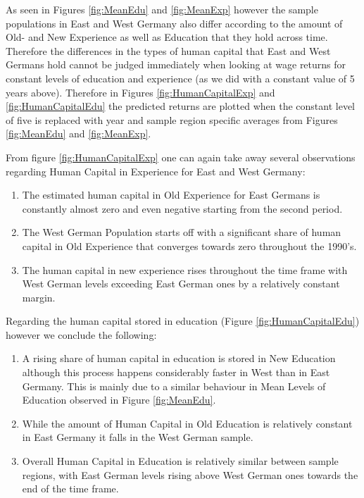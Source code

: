 \documentclass{article}
\begin{document}
As seen in Figures \ref{fig:MeanEdu} and \ref{fig:MeanExp} however the sample populations in East and West Germany also differ according to the amount of Old- and New Experience as well as Education that they hold across time. Therefore the differences in the types of human capital that East and West Germans hold cannot be judged immediately when looking at wage returns for constant levels of education and experience (as we did with a constant value of 5 years above).  
Therefore in Figures \ref{fig:HumanCapitalExp} and \ref{fig:HumanCapitalEdu} the predicted returns are plotted when the constant level of five is replaced with year and sample region specific averages from Figures \ref{fig:MeanEdu} and \ref{fig:MeanExp}. 

From figure \ref{fig:HumanCapitalExp} one can again take away several observations regarding Human Capital in Experience for East and West Germany:

\begin{enumerate}
	\item The estimated human capital in Old Experience for East Germans is constantly almost zero and even negative starting from the second period.
	\item The West German Population starts off with a significant share of human capital in Old Experience that converges towards zero throughout the 1990's.
	\item The human capital in new experience rises throughout the time frame with West German levels exceeding East German ones by a relatively constant margin. 
\end{enumerate}

Regarding the human capital stored in education (Figure \ref{fig:HumanCapitalEdu}) however we conclude the following:

\begin{enumerate}
	\item A rising share of human capital in education is stored in New Education although this process happens considerably faster in West than in East Germany. This is mainly due to a similar behaviour in Mean Levels of Education observed in Figure \ref{fig:MeanEdu}.
	\item While the amount of Human Capital in Old Education is relatively constant in East Germany it falls in the West German sample.
	\item Overall Human Capital in Education is relatively similar between sample regions, with East German levels rising above West German ones towards the end of the time frame.
\end{enumerate}
\end{document}
